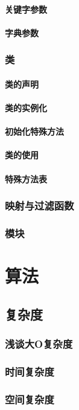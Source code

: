 \documentclass{book}
\begin{document}
\subsection{关键字参数}
\subsection{字典参数}
\section{类}
\subsection{类的声明}
\subsection{类的实例化}
\subsection{初始化特殊方法}
\subsection{类的使用}
\subsection{特殊方法表}
\section{映射与过滤函数}
\section{模块}
\part{算法}
\chapter{复杂度}
\section{浅谈大O复杂度}
\section{时间复杂度}
\section{空间复杂度}
\end{document}
